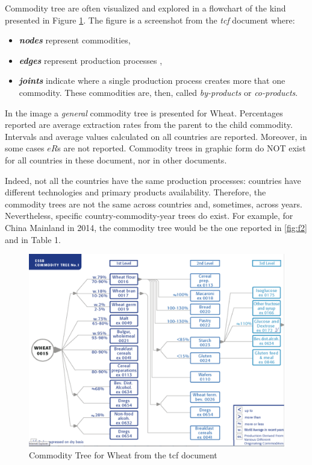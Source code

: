 \documentclass[]{article}
\providecommand{\tightlist}{%
  \setlength{\itemsep}{0pt}\setlength{\parskip}{0pt}}
\begin{document}
Commodity tree are often visualized and explored in a flowchart of the
kind presented in Figure \ref{fig:f1}. The figure is a screenshot from
the \emph{tcf} document where:

\begin{itemize}
\tightlist
\item
  \textbf{\emph{nodes}} represent commodities,
\item
  \textbf{\emph{edges}} represent production processes ,
\item
  \textbf{\emph{joints}} indicate where a single production process
  creates more that one commodity. These commodities are, then, called
  \emph{by-products} or \emph{co-products}.
\end{itemize}

In the image a \emph{general} commodity tree is presented for Wheat.
Percentages reported are average extraction rates from the parent to the
child commodity. Intervals and average values calculated on all
countries are reported. Moreover, in some cases \(eR\)s are not
reported. Commodity trees in graphic form do NOT exist for all countries
in these document, nor in other documents.

Indeed, not all the countries have the same production processes:
countries have different technologies and primary products availability.
Therefore, the commodity trees are not the same across countries and,
sometimes, across years. Nevertheless, specific country-commodity-year
trees do exist. For example, for China Mainland in 2014, the commodity
tree would be the one reported in \ref{fig:f2} and in Table 1.

\begin{figure}[H]

{\centering \includegraphics[width=1\linewidth]{images/commodityTree/01_tcfWheat} 

}

\caption{\label{fig:f1}Commodity Tree for Wheat from the tcf document}\label{fig:f1}
\end{figure}
\end{document}
